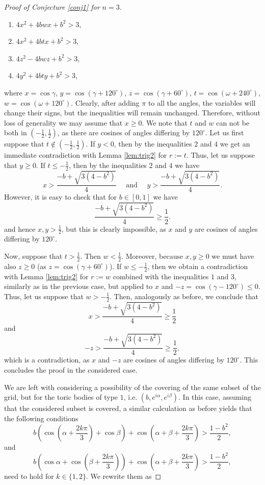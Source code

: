 \documentclass[12pt, a4paper]{article}
\theoremstyle{plain} %
\theoremstyle{definition} %
\theoremstyle{remark} %
\begin{document}
\begin{proof}[Proof of Conjecture \ref{conj1} for $n=3$]
\begin{enumerate}
\item $4x^2 + 4bwx + b^2 > 3$,
\item $4x^2 + 4btx + b^2 > 3$,
\item $4z^2 - 4bwz + b^2 > 3$,
\item $4y^2 + 4bty + b^2 > 3$,
\end{enumerate}
where $x = \cos \gamma$, $y = \cos(\gamma + 120^{\circ})$, $z=\cos (\gamma + 60^{\circ})$, $t=\cos (\omega+240^{\circ})$, $w = \cos (\omega + 120^{\circ})$. Clearly, after adding $\pi$ to all the angles, the variables will change their signs, but the inequalities will remain unchanged. Therefore, without loss of generality we may assume that $x \geq 0$. We note that $t$ and $w$ can not be both in $\left ( -\frac{1}{2}, \frac{1}{2} \right )$, as there are cosines of angles differing by $120^{\circ}$. Let us first suppose that $t \not \in \left ( -\frac{1}{2}, \frac{1}{2} \right )$. If $y < 0$, then by the inequalities $2$ and $4$ we get an immediate contradiction with Lemma \ref{lem:trig2} for $r:=t$. Thus, let us suppose that $y \geq 0$. If $t \leq - \frac{1}{2}$, then by the inequalities $2$ and $4$ we have
$$x > \frac{-b+\sqrt{3(4-b^2)}}{4} \quad \text{ and } \quad y > \frac{-b+\sqrt{3(4-b^2)}}{4}.$$
However, it is easy to check that for $b \in [0, 1]$ we have
$$\frac{-b+\sqrt{3(4-b^2)}}{4} \geq \frac{1}{2}.$$
and hence $x, y > \frac{1}{2}$, but this is clearly impossible, as $x$ and $y$ are cosines of angles differing by $120^{\circ}$.

Now, suppose that $t > \frac{1}{2}.$ Then $w < \frac{1}{2}$. Moreover, because $x, y \geq 0$ we must have also $z \geq 0$ (as $z=\cos (\gamma + 60^{\circ})$). If $w \leq -\frac{1}{2}$, then we obtain a contradiction with Lemma \ref{lem:trig2} for $r:=w$ combined with the inequalities $1$ and $3$, similarly as in the previous case, but applied to $x$ and $-z=\cos(\gamma - 120^{\circ}) \leq 0$. Thus, let us suppose that $w > -\frac{1}{2}$. Then, analogously as before, we conclude that
$$x > \frac{-b+\sqrt{3(4-b^2)}}{4} \geq \frac{1}{2}$$
and
$$-z > \frac{-b+\sqrt{3(4-b^2)}}{4} \geq \frac{1}{2},$$
which is a contradiction, as $x$ and $-z$ are cosines of angles differing by $120^{\circ}$. This concludes the proof in the considered case. 


We are left with considering a possibility of the covering of the same subset of the grid, but for the toric bodies of type $1$, i.e. $(b, e^{i \alpha}, e^{i \beta})$. In this case, assuming that the considered subset is covered, a similar calculation as before yields that the following conditions
$$b \left ( \cos \left ( \alpha + \frac{2k\pi}{3} \right ) + \cos \beta  \right ) + \cos \left( \alpha + \beta+ \frac{2k\pi}{3} \right ) > \frac{1-b^2}{2},  $$
and
$$b \left ( \cos \alpha + \cos \left ( \beta + \frac{2k\pi}{3} \right ) \right )  + \cos \left( \alpha + \beta+ \frac{2k\pi}{3} \right ) > \frac{1-b^2}{2},  $$
need to hold for $k \in \{1, 2\}$. We rewrite them as


\end{proof}
\end{document}
